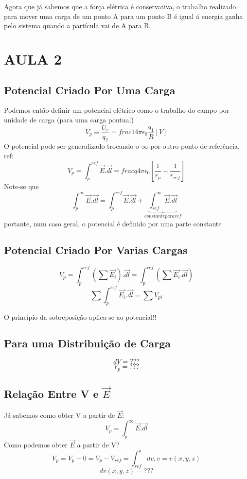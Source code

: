 \documentclass[a4paper]{article}
\begin{document}
Agora que já sabemos que a força elétrica é conservativa, o trabalho realizado para mover uma carga 
de um ponto A para um ponto B é igual á energia ganha pelo sistema quando a partícula vai de A para B.

\section{AULA 2}

\subsection{Potencial Criado Por Uma Carga}

Podemos então definir um potencial elétrico como o trabalho do campo por unidade de carga (para uma carga pontual)
\[V_p \equiv  \frac{U_e}{q_2} = frac{1}{4\pi\epsilon_0} \frac{q_1}{R}  \left[V\right]\]
O potencial pode ser generalizado trocando o $\infty$ por outro ponto de referência, ref:
\[V_p = \int_{p}^{ref}\vec{E}.\vec{dl}= frac{q}{4\pi\epsilon_0}\left[\frac{1}{r_p}-\frac{1}{r_{ref}}\right]\]
Note-se que
\[\int_{p}^{\infty}\vec{E}.\vec{dl}= \int_{p}^{ref}\vec{E}.\vec{dl} + \underbrace{\int_{ref}^{\infty}\vec{E}.\vec{dl}}_{constante para ref}\]
portante, num caso geral, o potencial é definido por uma parte constante

\subsection{Potencial Criado Por Varias Cargas}

\[V_p = \int_{p}^{ref}\left(\sum\vec{E_i}\right).\vec{dl} = \int_{p}^{ref}\left(\sum\vec{E_i}.\vec{dl}\right)\]
\[\sum\int_{p}^{ref}\vec{E_i}.\vec{dl} = \sum V_{pi}\]

O princípio da sobreposição aplica-se ao potencial!!

\subsection{Para uma Distribuição de Carga}
\[dV = ???\]
\[V_p = ???\]

\subsection{Relação Entre V e \texorpdfstring{$\vec{E}$}{E}}
Já sabemos como obter V a partir de $\vec{E}$:
\[V_p = \int_{p}^{\infty}\vec{E}.\vec{dl}\]
Como podemos obter $\vec{E}$ a partir de V\@?
\[V_p = V_p-0 = V_p-V_{ref}= \int_{ref}^{p}dv, v= v \left(x,y,z\right)\]
\[dv\left(x,y,z\right) = ???\]
\end{document}
